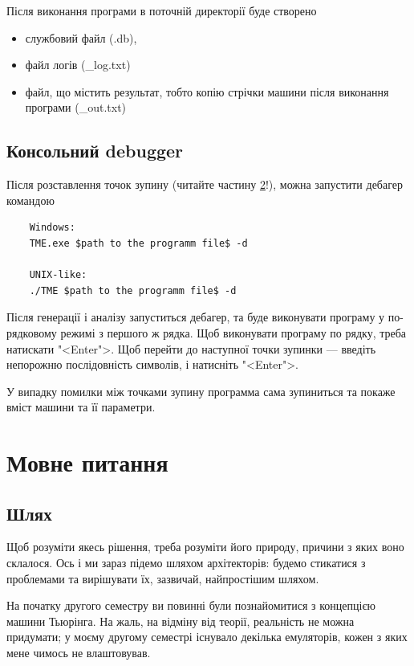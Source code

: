 \documentclass[oneside,final,14pt]{extreport}
\begin{document}
Після виконання програми в поточній директорії буде створено 
\begin{itemize}
	\item службовий файл (.db),
	\item файл логів (\*\_log.txt)
	\item файл, що містить результат, тобто копію стрічки машини після виконання програми (\*\_out.txt)
\end{itemize}

\section{Консольний debugger}
Після розставлення точок зупину (читайте частину \ref{chapter:1}!), можна запустити дебагер командою
\begin{tcolorbox}	
\begin{verbatim}
	Windows:
	TME.exe $path to the programm file$ -d

	UNIX-like:
	./TME $path to the programm file$ -d
\end{verbatim}
\end{tcolorbox}

Після генерації і аналізу запуститься дебагер, та буде виконувати програму у по-рядковому режимі з першого ж рядка.
Щоб виконувати програму по рядку, треба натискати "<Enter">. Щоб перейти до наступної точки зупинки --- введіть непорожню послідовність символів, і натисніть "<Enter">.

У випадку помилки між точками зупину программа сама зупиниться та покаже вміст машини та її параметри.

\chapter{Мовне питання}
\label{chapter:1}

\section{Шлях}
Щоб розуміти якесь рішення, треба розуміти його природу, причини з яких воно склалося. Ось і ми зараз підемо шляхом архітекторів: будемо стикатися з проблемами та вирішувати їх, зазвичай, найпростішим шляхом.

На початку другого семестру ви повинні були познайомитися з концепцією машини Тьюрінга. На жаль, на відміну від теорії, реальність не можна придумати; у моєму другому семестрі існувало декілька емуляторів, кожен з яких мене чимось не влаштовував. 
\end{document}
